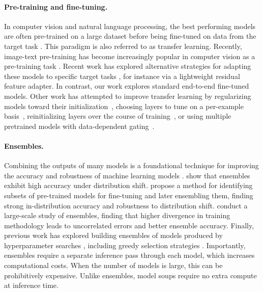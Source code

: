 \documentclass[nohyperref]{article}
\theoremstyle{plain}
\theoremstyle{definition}
\theoremstyle{remark}
\begin{document}
        \paragraph{Pre-training and fine-tuning.}
        In computer vision and natural language processing, the best performing models are often pre-trained on a
        large dataset before being fine-tuned on
        data from the target task
        \cite{donahue2014decaf,yosinski2014transferable, sharif2014cnn, girshick2014rich, mahajan2018exploring,kornblith2019better, yalniz2019billion, kolesnikov2020big,bommasani2021opportunities}.
        This paradigm is also referred to as transfer learning.
        Recently, image-text pre-training has become 
        increasingly popular in computer vision as a pre-training task
        \cite{radford2021learning, jia2021scaling, mu2021slip, pham2021scaling, yu2022coca}.
        Recent work has explored alternative strategies for adapting these models to specific target tasks \cite{coop,gao2021clip,zhang2021tip}, for instance via a lightweight residual feature adapter.
        In contrast, our work explores standard end-to-end fine-tuned models. Other work has attempted to improve transfer learning by regularizing models toward their initialization~\cite{xuhong2018explicit}, choosing layers to tune on a per-example basis~\cite{guo2019spottune}, reinitializing layers over the course of training~\cite{li2020rifle}, or using multiple pretrained models with data-dependent gating~\cite{shu2021zoo}.
        
        
        \paragraph{Ensembles.} Combining the outputs of many models is a foundational
        technique for improving the accuracy and robustness of machine learning models 
        \cite{dietterich2000ensemble, bauer1999empirical, breiman1996bagging,friedman2001elements, deepensembles, FREUND1997119}.
        \citet{ovadia2019can} show that ensembles exhibit high accuracy under distribution shift.
        \citet{mustafa2020deep} propose a method for identifying subsets of pre-trained models for fine-tuning and later ensembling them, finding strong in-distribution accuracy and robustness to distribution shift.
        \citet{gontijo2021no} conduct a large-scale study of ensembles, finding that higher divergence in training methodology leads to uncorrelated errors and better ensemble accuracy.
        Finally, previous work has explored building ensembles of models produced by hyperparameter searches \cite{snoek2015scalable,mendoza2016towards,saikia2020optimized}, including greedy selection strategies \cite{caruana2004ensemble,caruana2006getting,levesque2016bayesian,wenzel2020hyperparameter}.
        Importantly, ensembles require a separate inference pass through each model, which increases computational costs. When the number of models is large, this can be prohibitively expensive. 
        Unlike ensembles, model soups require no extra compute at inference time.
        
\end{document}

